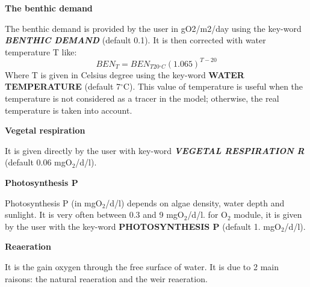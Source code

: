 {\bf  The benthic demand}

 The benthic demand is provided by the user in gO2/m2/day using the key-word \textbf{\textit{BENTHIC DEMAND}} (default 0.1). It is then corrected with water temperature T like:
\[{BEN}_T={BEN}_{T20{}^\circ C}{\left(1.065\right)}^{T-20}\]
Where T is given in Celsius degree using the key-word \textbf{WATER TEMPERATURE} (default 7${}^\circ$C). This value of temperature is useful when the temperature is not considered as a tracer in the model; otherwise, the real temperature is taken into account.




{\bf  Vegetal respiration}

 It is given directly by the user with key-word \textbf{\textit{VEGETAL RESPIRATION R}} (default 0.06 mgO${}_{2}$/d/l).


{\bf  Photosynthesis P}

 Photosynthesis P (in mgO${}_{2}$/d/l) depends on algae density, water depth and sunlight. It is very often between 0.3 and 9 mgO${}_{2}$/d/l. for O${}_{2}$ module, it is given by the user with the key-word \textbf{PHOTOSYNTHESIS P} (default 1. mgO${}_{2}$/d/l).


{\bf  Reaeration}

 It is the gain oxygen through the free surface of water. It is due to 2 main raisons:  the natural reaeration and the weir reaeration.

